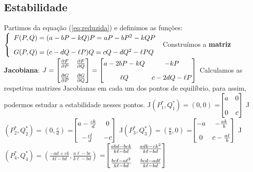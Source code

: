 \subsection{Estabilidade}
Partimos da equação (\ref{eq:reduzida}) e definimos as funções:\bigskip\medskip\newline\noindent
$
\left\{
\begin{array}{l}
F(P,Q)=(a-bP-kQ)P=aP-bP^2-kQP  \medskip  \\
G(P,Q)=(c-dQ-\ell P)Q=cQ-dQ^2-\ell PQ
\end{array}
\right.
$
\bigskip\medskip\newline\noindent Construímos a \textbf{matriz Jacobiana}:\bigskip\medskip\newline\noindent
$J=
\renewcommand{\arraystretch}{1.25}
\begin{bmatrix}
  \frac{\partial F}{\partial P} & \frac{\partial F}{\partial Q}\medskip  \\
  \frac{\partial G}{\partial P} & \frac{\partial G}{\partial Q}
\end{bmatrix}
=
\renewcommand{\arraystretch}{1.25}
\begin{bmatrix}
  a-2bP-kQ & -kP\medskip  \\
  \ell Q & c-2dQ- \ell P
 \end{bmatrix}
$
\bigskip\medskip\newline\noindent Calculamos as respetivas matrizes Jacobianas em cada um dos pontos de equilíbrio, para assim, podermos estudar a estabilidade nesses pontos. \bigskip\medskip\newline\noindent
J$(P_{1}^{*},Q_{1}^{*})=\left(0,0\right)$ =$
\renewcommand{\arraystretch}{1.25}
\begin{bmatrix}
  a & 0\medskip  \\
  0 & c
\end{bmatrix}
$
\medskip\bigskip \newline
J$(P_{2}^{*},Q_{2}^{*})=\left(0,\frac{c}{d}\right)$ =$
\renewcommand{\arraystretch}{1.25}
\begin{bmatrix}
  a-\frac{ck}{d} & 0\medskip  \\
  -\frac{cl}{d} & -c
\end{bmatrix}
$
\medskip\bigskip \newline
J$(P_{3}^{*},Q_{3}^{*})=\left(\frac{a}{b},0\right)$ =$
\renewcommand{\arraystretch}{1.25}
\begin{bmatrix}
  -a & -\frac{ak}{b} \medskip  \\
  0 & c- \frac{a \ell}{b}
\end{bmatrix}
$
\medskip\bigskip \newline
J$(P_{4}^{*},Q_{4}^{*})=\left(\frac {-ad+ck}{kl-bd},\frac{a \ell-bc}{k \ell-bd}\right)$ =$
\renewcommand{\arraystretch}{1.25}
\begin{bmatrix}
  \frac{abd-bck}{k \ell-bd} & \frac{adk-ck^2}{k \ell-bd}\medskip  \\
  \frac{bc \ell- a \ell^2}{k \ell-bd} & \frac{bcd-ad \ell}{k \ell-bd}
\end{bmatrix}
$





